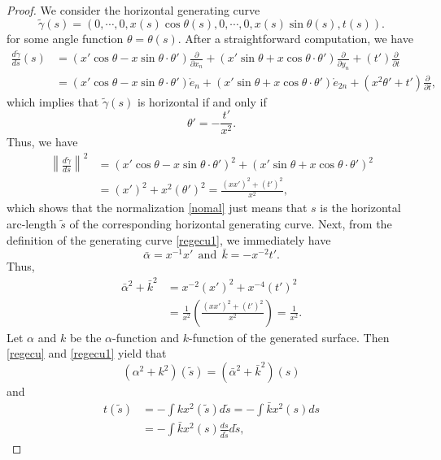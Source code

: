 \documentclass[10pt,a4paper]{amsart}
\begin{document}
\begin{proof}
We consider the horizontal generating curve 
\[\tilde{\gamma}(s)=(0,\cdots,0,x(s)\cos{\theta(s)},0,\cdots,0,x(s)\sin{\theta(s)},t(s)).\]
for some angle function $\theta=\theta(s)$. After a straightforward computation, we have
\[\begin{split}
\frac{d\tilde{\gamma}}{ds}(s)&=(x'\cos{\theta}-x\sin{\theta}\cdot\theta')\frac{\partial}{\partial x_n}+(x'\sin{\theta}+x\cos{\theta}\cdot\theta')\frac{\partial}{\partial y_n}+(t')\frac{\partial}{\partial t}\\
&=(x'\cos{\theta}-x\sin{\theta}\cdot\theta')\mathring{e}_{n}+(x'\sin{\theta}+x\cos{\theta}\cdot\theta')\mathring{e}_{2n}+(x^2\theta'+t')\frac{\partial}{\partial t},
\end{split}\]
which implies that $\tilde{\gamma}(s)$ is horizontal if and only if 
\begin{equation*}
\theta'=-\frac{t'}{x^2}.
\end{equation*}
Thus, we have
\[\begin{split}
\left\|\frac{d\tilde{\gamma}}{ds}\right\|^{2}&=(x'\cos{\theta}-x\sin{\theta}\cdot\theta')^{2}+(x'\sin{\theta}+x\cos{\theta}\cdot\theta')^{2}\\
&=(x')^{2}+x^{2}(\theta')^{2}=\frac{(xx')^2+(t')^2}{x^2},
\end{split}\]
which shows that the normalization \eqref{nomal} just means that $s$ is the horizontal arc-length $\tilde{s} $ of the corresponding horizontal generating curve. Next, from the definition of the generating curve \eqref{regecu1}, we immediately have 
\begin{equation}\label{goinf4}
\bar\alpha=x^{-1}x'\ \ \textrm{and}\ \  \bar k=-x^{-2}t'. 
\end{equation}
Thus,
\[\begin{split}
\bar\alpha^{2}+\bar k^{2}&=x^{-2}(x')^{2}+x^{-4}(t')^{2}\\
&=\frac{1}{x^2}\left(\frac{(xx')^{2}+(t')^{2}}{x^{2}}\right)=\frac{1}{x^2}.
\end{split}\]
Let $\alpha$ and $k$ be the $\alpha$-function and $k$-function of the generated surface. Then \eqref{regecu} and \eqref{regecu1} yield that
\[(\alpha^2+k^{2})(\tilde{s})=(\bar\alpha^2+\bar k^{2})(s)\] and
\begin{equation}\label{regecu2}
\begin{split}
t(\tilde{s})&=-\int kx^2(\tilde{s})d\tilde{s}=-\int \bar kx^2(s)ds\\
&=-\int \bar kx^2(s)\frac{ds}{d\tilde{s}}d\tilde{s},
\end{split}

\end{equation}
\end{proof}
\end{document}
